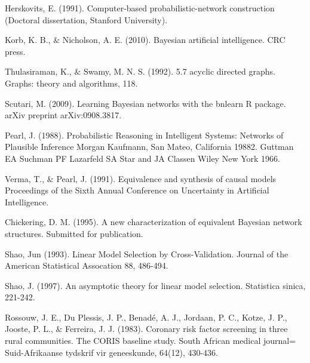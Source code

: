 \documentclass{article}
\begin{document}
{\fontsize{8pt}{10.8pt}\selectfont [1] Herskovits, E. (1991). Computer-based probabilistic-network construction (Doctoral dissertation, Stanford University).\par}
\vspace{-1em}
{\fontsize{8pt}{10.8pt}\selectfont [2] Korb, K. B., $\&$  Nicholson, A. E. (2010). Bayesian artificial intelligence. CRC press.\par}
\vspace{-1em}
{\fontsize{8pt}{10.8pt}\selectfont [3] Thulasiraman, K., $\&$  Swamy, M. N. S. (1992). 5.7 acyclic directed graphs. Graphs: theory and algorithms, 118.\par}
\vspace{-1em}
{\fontsize{8pt}{10.8pt}\selectfont [4] Scutari, M. (2009). Learning Bayesian networks with the bnlearn R package. arXiv preprint arXiv:0908.3817.\par}
\vspace{-1em}
{\fontsize{8pt}{10.8pt}\selectfont [5] Pearl, J. (1988). Probabilistic Reasoning in Intelligent Systems: Networks of Plausible Inference Morgan Kaufmann, San Mateo, California 19882. Guttman EA Suchman PF Lazarfeld SA Star and JA Classen Wiley New York 1966.\par}
\vspace{-1em}
{\fontsize{8pt}{10.8pt}\selectfont [6] Verma, T., $\&$  Pearl, J. (1991). Equivalence and synthesis of causal models Proceedings of the Sixth Annual Conference on Uncertainty in Artificial Intelligence.\par}
\vspace{-1em}
{\fontsize{8pt}{10.8pt}\selectfont [7] Chickering, D. M. (1995). A new characterization of equivalent Bayesian network structures. Submitted for publication.\par}
\vspace{-1em}
{\fontsize{8pt}{10.8pt}\selectfont [8] Shao, Jun (1993). Linear Model Selection by Cross-Validation. Journal of the American Statistical Assocation 88, 486-494.\par}
\vspace{-1em}
{\fontsize{8pt}{10.8pt}\selectfont [9] Shao, J. (1997). An asymptotic theory for linear model selection. Statistica sinica, 221-242.\par}
\vspace{-1em}
{\fontsize{8pt}{10.8pt}\selectfont [10] Rossouw, J. E., Du Plessis, J. P., Benadé, A. J., Jordaan, P. C., Kotze, J. P., Jooste, P. L., $\&$  Ferreira, J. J. (1983). Coronary risk factor screening in three rural communities. The CORIS baseline study. South African medical journal= Suid-Afrikaanse tydskrif vir geneeskunde, 64(12), 430-436.\par}
\end{document}
